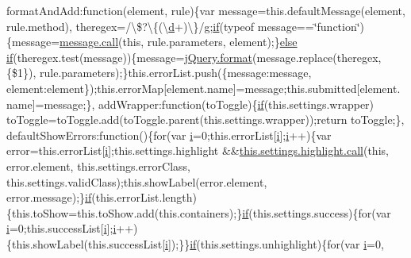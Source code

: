 \begin{DoxyCompactItemize}
format\+And\+Add\+:function(element, rule)\{var message=this.\+default\+Message(element, rule.\+method), theregex=/\textbackslash{}\$?\textbackslash{}\{(\textbackslash{}\hyperlink{_scripts_2respond_8min_8js_aeb337d295abaddb5ec3cb34cc2e2bbc9}{d}+)\textbackslash{}\}/\hyperlink{_scripts_2respond_8min_8js_a103df269476e78897c9c4c6cb8f4eb06}{g};\hyperlink{_scripts_2respond_8min_8js_a93851d60dd037a83509a1757b9ee7b66}{if}(typeof message==\char`\"{}function\char`\"{})\{message=\hyperlink{_scripts_2dropzone_8js_aafc46d047b4d7639fd2c4b927ec5048c}{message.\+call}(this, rule.\+parameters, element);\}\hyperlink{_scripts_2jquery_8validate_8js_a0544c3fe466e421738dae463968b70ba}{else} \hyperlink{_scripts_2respond_8min_8js_a93851d60dd037a83509a1757b9ee7b66}{if}(theregex.\+test(message))\{message=\hyperlink{_scripts_2jquery_8validate_8js_a387137c43ed9616d39ba90e890d181eb}{j\+Query.\+format}(message.\+replace(theregex, \textquotesingle{}\{\$1\}\textquotesingle{}), rule.\+parameters);\}this.\+error\+List.\+push(\{message\+:message, element\+:element\});this.\+error\+Map\mbox{[}element.\+name\mbox{]}=message;this.\+submitted\mbox{[}element.\+name\mbox{]}=message;\}, add\+Wrapper\+:function(to\+Toggle)\{\hyperlink{_scripts_2respond_8min_8js_a93851d60dd037a83509a1757b9ee7b66}{if}(this.\+settings.\+wrapper) to\+Toggle=to\+Toggle.\+add(to\+Toggle.\+parent(this.\+settings.\+wrapper));return to\+Toggle;\}, default\+Show\+Errors\+:function()\{for(var \hyperlink{_scripts_2respond_8min_8js_a5e25b1d1bed9ab5f3174b76d6a722180}{i}=0;this.\+error\+List\mbox{[}\hyperlink{_scripts_2respond_8min_8js_a5e25b1d1bed9ab5f3174b76d6a722180}{i}\mbox{]};\hyperlink{_scripts_2respond_8min_8js_a5e25b1d1bed9ab5f3174b76d6a722180}{i}++)\{var error=this.\+error\+List\mbox{[}\hyperlink{_scripts_2respond_8min_8js_a5e25b1d1bed9ab5f3174b76d6a722180}{i}\mbox{]};this.\+settings.\+highlight \&\&\hyperlink{_scripts_2dropzone_8js_aafc46d047b4d7639fd2c4b927ec5048c}{this.\+settings.\+highlight.\+call}(this, error.\+element, this.\+settings.\+error\+Class, this.\+settings.\+valid\+Class);this.\+show\+Label(error.\+element, error.\+message);\}\hyperlink{_scripts_2respond_8min_8js_a93851d60dd037a83509a1757b9ee7b66}{if}(this.\+error\+List.\+length)\{this.\+to\+Show=this.\+to\+Show.\+add(this.\+containers);\}\hyperlink{_scripts_2respond_8min_8js_a93851d60dd037a83509a1757b9ee7b66}{if}(this.\+settings.\+success)\{for(var \hyperlink{_scripts_2respond_8min_8js_a5e25b1d1bed9ab5f3174b76d6a722180}{i}=0;this.\+success\+List\mbox{[}\hyperlink{_scripts_2respond_8min_8js_a5e25b1d1bed9ab5f3174b76d6a722180}{i}\mbox{]};\hyperlink{_scripts_2respond_8min_8js_a5e25b1d1bed9ab5f3174b76d6a722180}{i}++)\{this.\+show\+Label(this.\+success\+List\mbox{[}\hyperlink{_scripts_2respond_8min_8js_a5e25b1d1bed9ab5f3174b76d6a722180}{i}\mbox{]});\}\}\hyperlink{_scripts_2respond_8min_8js_a93851d60dd037a83509a1757b9ee7b66}{if}(this.\+settings.\+unhighlight)\{for(var \hyperlink{_scripts_2respond_8min_8js_a5e25b1d1bed9ab5f3174b76d6a722180}{i}=0, 
\end{DoxyCompactItemize}

